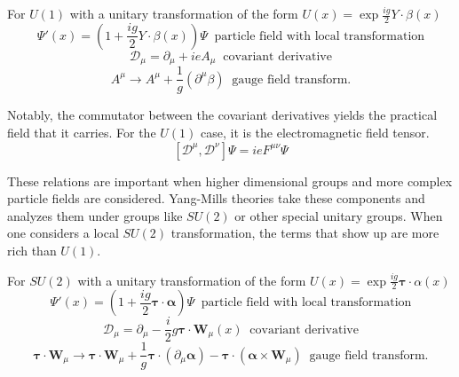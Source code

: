 For $U(1)$ with a unitary transformation of the form $U(x) = \exp{\frac{ig}{2}Y\cdot\beta(x)}$ 
\begin{equation}\Psi'(x)= (1+\frac{ig}{2}Y\cdot\beta(x))\Psi \;\;\text{particle field with local transformation}\end{equation}
\begin{equation}\mathcal{D}_\mu = \partial_\mu + ieA_\mu \;\;\text{covariant derivative}\end{equation}
\begin{equation}A^\mu \rightarrow A^\mu + \frac{1}{g}(\partial^\mu \beta) \;\;\text{gauge field transform.} \end{equation} 


Notably, the commutator between the covariant derivatives yields the practical field that it carries. For the $U(1) $ case, it is the electromagnetic field tensor. 
\begin{equation}  \left[ \mathcal{D}^\mu,\mathcal{D}^\nu\right] \Psi = ie F^{\mu\nu} \Psi\end{equation}

These relations are important when higher dimensional groups and more complex particle fields are considered. Yang-Mills theories take these components and analyzes them under groups like $SU(2)$ or other special unitary groups. When one considers a local $SU(2)$ transformation, the terms that show up are more rich than $U(1)$.  

For $SU(2)$ with a unitary transformation of the form $U(x) = \exp{\frac{ig}{2}\bm{\tau}\cdot\alpha(x)}$ 
\begin{equation}\Psi'(x)= (1 + \frac{ig}{2}\bm{\tau}\cdot\bm{\alpha})\Psi \;\;\text{particle field with local transformation}\end{equation}
\begin{equation}\mathcal{D}_\mu = \partial_\mu -\frac{i}{2} g \bm{\tau}\cdot \bm{W}_\mu(x) \;\;\text{covariant derivative}\end{equation}
\begin{equation}\bm{\tau}\cdot\bm{W}_\mu \rightarrow  \bm{\tau}\cdot\bm{W}_\mu + \frac{1}{g}\bm{\tau}\cdot(\partial_\mu \bm{\alpha}) - \bm{\tau}\cdot (\bm{\alpha}\times\bm{W}_\mu) \;\;\text{gauge field transform.} \end{equation}


%

